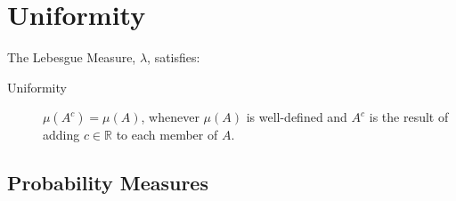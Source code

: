 \documentclass[12pt]{extarticle}
\begin{document}
\section{Uniformity}
\label{sec:uniformity}

The Lebesgue Measure, $\lambda$, satisfies:
\begin{description}
\item[Uniformity]
$\mu(A^c) = \mu(A)$, whenever $\mu(A)$ is well-defined and $A^c$ is the result of adding $c \in \mathbb{R}$ to each member of $A$.\label{gloss:uniformity}
\end{description}





\subsection{Probability Measures}
\label{sec:coin-toss-procedures}
\end{document}
